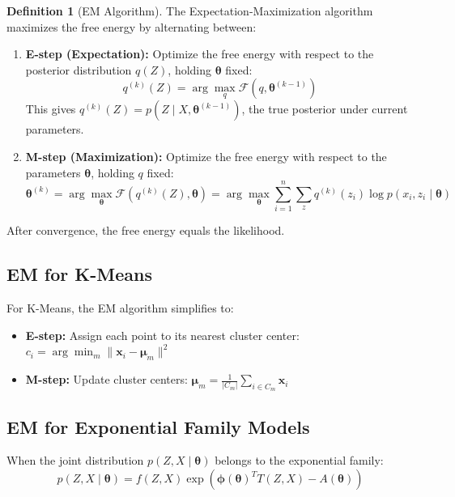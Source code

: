 \documentclass[12pt,a4paper]{article}
\theoremstyle{definition}
\newtheorem{definition}{Definition}[section]
\begin{document}
\begin{definition}[EM Algorithm]
The Expectation-Maximization algorithm maximizes the free energy by alternating between:

\begin{enumerate}
    \item \textbf{E-step (Expectation):} Optimize the free energy with respect to the posterior distribution $q(Z)$, holding $\boldsymbol{\theta}$ fixed:
    \[
    q^{(k)}(Z) = \arg\max_q \mathcal{F}(q, \boldsymbol{\theta}^{(k-1)})
    \]
    This gives $q^{(k)}(Z) = p(Z \mid X, \boldsymbol{\theta}^{(k-1)})$, the true posterior under current parameters.
    
    \item \textbf{M-step (Maximization):} Optimize the free energy with respect to the parameters $\boldsymbol{\theta}$, holding $q$ fixed:
    \[
    \boldsymbol{\theta}^{(k)} = \arg\max_{\boldsymbol{\theta}} \mathcal{F}(q^{(k)}(Z), \boldsymbol{\theta}) = \arg\max_{\boldsymbol{\theta}} \sum_{i=1}^n \sum_z q^{(k)}(z_i) \log p(x_i, z_i \mid \boldsymbol{\theta})
    \]
\end{enumerate}

After convergence, the free energy equals the likelihood.
\end{definition}

\subsection{EM for K-Means}

For K-Means, the EM algorithm simplifies to:
\begin{itemize}
    \item \textbf{E-step:} Assign each point to its nearest cluster center: $c_i = \arg\min_m \|\mathbf{x}_i - \boldsymbol{\mu}_m\|^2$
    \item \textbf{M-step:} Update cluster centers: $\boldsymbol{\mu}_m = \frac{1}{|C_m|} \sum_{i \in C_m} \mathbf{x}_i$
\end{itemize}

\subsection{EM for Exponential Family Models}

When the joint distribution $p(Z, X \mid \boldsymbol{\theta})$ belongs to the exponential family:
\[
p(Z, X \mid \boldsymbol{\theta}) = f(Z, X) \exp(\boldsymbol{\phi}(\boldsymbol{\theta})^T T(Z, X) - A(\boldsymbol{\theta}))
\]
\end{document}
